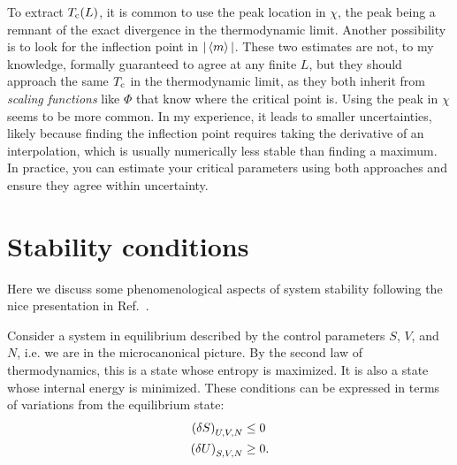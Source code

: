 To extract $T_{\rm c}(L)$, it is common to use the peak location in $\chi$, the peak
being a remnant of the exact divergence in the thermodynamic limit. Another
possibility is to look for the inflection point in $|\ev{m}|$. These two
estimates are not, to my knowledge, formally guaranteed to agree at any finite
$L$, but they should approach the same $T_{\rm c}$ in the thermodynamic limit, as they
both inherit from {\it scaling functions} like $\Phi$ that
know where the critical point is. Using the peak in $\chi$ seems to be more
common. In my experience, it leads to smaller uncertainties, likely because
finding the inflection point requires taking the derivative of an interpolation,
which is usually numerically less stable than finding a maximum. In 
practice, you can estimate your critical parameters using both approaches and
ensure they agree within uncertainty.

\section{Stability conditions}

Here we discuss some phenomenological aspects of system stability following the
nice presentation in Ref.~\cite{debenedetti1996}.

Consider a system in equilibrium described by the control parameters $S$, $V$,
and $N$, i.e. we are in the microcanonical picture. 
By the second law of thermodynamics, this is a
state whose entropy is maximized. It is also a state 
whose internal energy is minimized. These
conditions can be expressed in terms of variations from the equilibrium state:
\begin{equation}\begin{aligned}
\left(\delta S\right)_{U,V,N} &\leq 0\\
\left(\delta U\right)_{S,V,N} &\geq 0.
\end{aligned}\end{equation}

